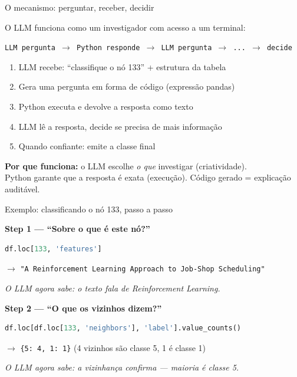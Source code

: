 \documentclass{beamer}
\begin{document}
\begin{frame}{O mecanismo: perguntar, receber, decidir}

  O LLM funciona como um investigador com acesso a um terminal:

  \vspace{0.5em}
  \begin{center}
    \large
    \texttt{LLM pergunta $\rightarrow$ Python responde $\rightarrow$ LLM pergunta $\rightarrow$ ... $\rightarrow$ decide}
  \end{center}

  \vspace{0.5em}
  \begin{enumerate}
    \item LLM recebe: ``classifique o nó 133'' + estrutura da tabela
    \item Gera uma pergunta em forma de código (expressão pandas)
    \item Python executa e devolve a resposta como texto
    \item LLM lê a resposta, decide se precisa de mais informação
    \item Quando confiante: emite a classe final
  \end{enumerate}

  \vspace{0.5em}
  \textbf{Por que funciona:} o LLM escolhe \emph{o que} investigar (criatividade).\\
  Python garante que a resposta é exata (execução). Código gerado = explicação auditável.
\end{frame}



\begin{frame}[fragile]{Exemplo: classificando o nó 133, passo a passo}

  \textbf{Step 1 --- ``Sobre o que é este nó?''}
  \begin{lstlisting}[language=Python, basicstyle=\ttfamily\scriptsize]
df.loc[133, 'features']
  \end{lstlisting}
  \vspace{0.1em}
  $\rightarrow$ \texttt{"A Reinforcement Learning Approach to Job-Shop Scheduling"}

  \vspace{0.5em}
  \emph{O LLM agora sabe: o texto fala de Reinforcement Learning.}

  \vspace{0.8em}
  \textbf{Step 2 --- ``O que os vizinhos dizem?''}
  \begin{lstlisting}[language=Python, basicstyle=\ttfamily\scriptsize]
df.loc[df.loc[133, 'neighbors'], 'label'].value_counts()
  \end{lstlisting}
  \vspace{0.1em}
  $\rightarrow$ \texttt{\{5: 4, 1: 1\}} \quad (4 vizinhos são classe 5, 1 é classe 1)

  \vspace{0.5em}
  \emph{O LLM agora sabe: a vizinhança confirma --- maioria é classe 5.}
\end{frame}
\end{document}
